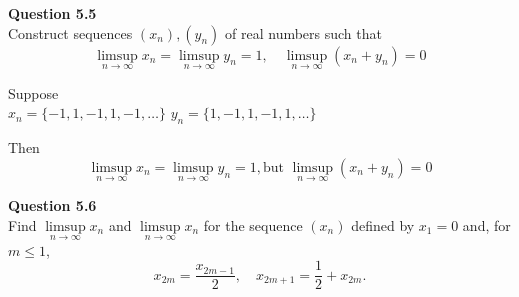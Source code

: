 \documentclass[12pt]{article}
\begin{document}
\vspace{1.5\baselineskip}
\textbf{Question 5.5} \\
Construct sequences $(x_n), (y_n)$ of real numbers such that
$$
\limsup\limits_{n\rightarrow \infty} x_n = 
\limsup\limits_{n\rightarrow \infty} y_n = 1, \quad
\limsup\limits_{n\rightarrow \infty} (x_n +y_n) = 0
$$

\vspace{1.5\baselineskip}
Suppose\\
\hspace*{\fill}
{$x_n = \{-1,1,-1,1,-1,\ldots\}$} \hfill {$y_n = \{1,-1,1,-1,1,\ldots\}$}
\hspace*{\fill}

\vspace{1.5\baselineskip}
Then 
$$
\limsup\limits_{n\rightarrow \infty} x_n = 
\limsup\limits_{n\rightarrow \infty} y_n = 1, \text{but }
\limsup\limits_{n\rightarrow \infty} (x_n +y_n) = 0
$$

\newpage
\textbf{Question 5.6}\\
Find $\limsup\limits_{n\rightarrow \infty} x_n$ and $\limsup\limits_{n\rightarrow \infty} x_n$ for the sequence $(x_n)$ defined by $x_1 = 0$ and, for $m\le 1$,
$$
x_{2m} = \frac{x_{2m-1}}{2}, \quad
x_{2m+1} = \frac{1}{2} + x_{2m}.
$$
\end{document}
